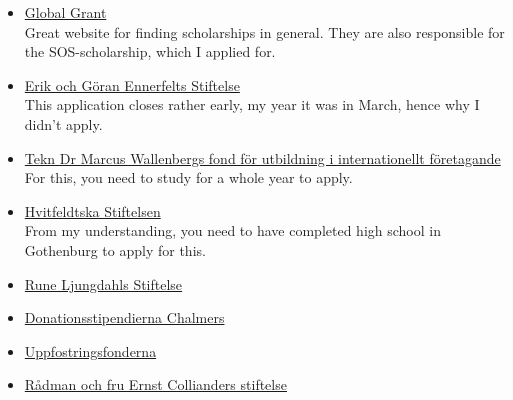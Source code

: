 \begin{itemize}
    \item \href{https://www.globalgrant.com}{Global Grant} \\ Great website for finding scholarships in general. They are also responsible for the SOS-scholarship, which I applied for.
    \item \href{https://egefonden.se}{Erik och Göran Ennerfelts Stiftelse} \\ This application closes rather early, my year it was in March, hence why I didn't apply.
    \item \href{https://tmw.wallenberg.org/anslagsguide}{Tekn Dr Marcus Wallenbergs fond för utbildning i internationellt företagande} \\ For this, you need to study for a whole year to apply.
    \item \href{https://wp.hvitfeldtskastiftelsen.se/universitetsstipendium/}{Hvitfeldtska Stiftelsen} \\ From my understanding, you need to have completed high school in Gothenburg to apply for this.
    \item \href{https://stiftelsenrljs.se/hogre-studier/}{Rune Ljungdahls Stiftelse}
    \item \href{https://www.chalmers.se/utbildning/studera-hos-oss/studentliv/stipendier-for-studenter/donationsstipendierna/}{Donationsstipendierna Chalmers}
    \item \href{https://www.uppfostringsfonderna.se}{Uppfostringsfonderna}
    \item \href{https://stiftelsemedel.se/rdman-och-fru-ernst-collianders-stiftelse-fr-vlgrande-ndaml/}{Rådman och fru Ernst Collianders stiftelse}
\end{itemize}
